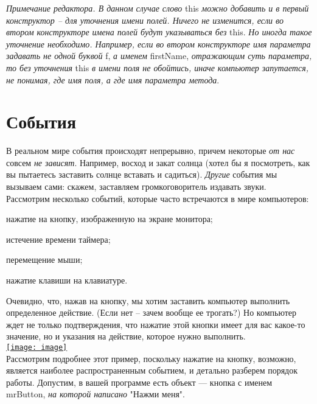 \documentclass[12pt, a4paper]{article}
\begin{document}
\textit{Примечание редактора. В данном случае слово}  this  \textit{можно добавить и в первый конструктор – для уточнения имени полей. Ничего не изменится, если во втором конструкторе имена полей будут указываться без}  this. \textit{Но иногда такое уточнение необходимо. Например, если во втором конструкторе имя параметра задавать не одной буквой}  f, \textit{а именем}  firstName, \textit{отражающим суть параметра, то без уточнения}  this  \textit{в имени поля не обойтись, иначе компьютер запутается, не понимая, где имя поля, а где имя параметра метода}.


\section{События}
В реальном мире события происходят непрерывно, причем некоторые \textit{от нас}  совсем \textit{не зависят}. Например, восход и закат солнца (хотел бы я посмотреть, как вы пытаетесь заставить солнце вставать и садиться). \textit{Другие}  события мы вызываем сами: скажем, заставляем громкоговоритель издавать звуки.\\

Рассмотрим несколько событий, которые часто встречаются в мире компьютеров:\\

\begin{itemize} {
\item{нажатие на кнопку, изображенную на экране монитора;}
\item{истечение времени таймера;}
\item{перемещение мыши;}
\item{нажатие клавиши на клавиатуре.}
} \end{itemize}

Очевидно, что, нажав на кнопку, мы хотим заставить компьютер выполнить определенное действие. (Если нет – зачем вообще ее трогать?) Но компьютер ждет не только подтверждения, что нажатие этой кнопки имеет для вас какое-то значение, но и указания на действие, которое нужно выполнить.\\


\bigbreak \href{http://www.intuit.ru//EDI/25_09_16_1/1474755579-437/tutorial/590/objects/3/files/02-27.jpg}                         {\texttt{[image: image]}}\\



Рассмотрим подробнее этот пример, поскольку нажатие на кнопку, возможно, является наиболее распространенным событием, и детально разберем порядок работы. Допустим, в вашей программе есть объект — кнопка с именем mrButton, \textit{на которой написано}  "Нажми меня".\\
\end{document}

